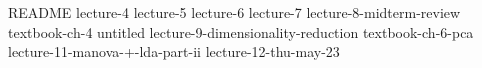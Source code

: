 \graphicspath{{README.md}}
{README}
{lecture-4}
{lecture-5}
{lecture-6}
{lecture-7}
{lecture-8-midterm-review}
{textbook-ch-4}
{untitled}
{lecture-9-dimensionality-reduction}
{textbook-ch-6-pca}
{lecture-11-manova-+-lda-part-ii}
{lecture-12-thu-may-23}
